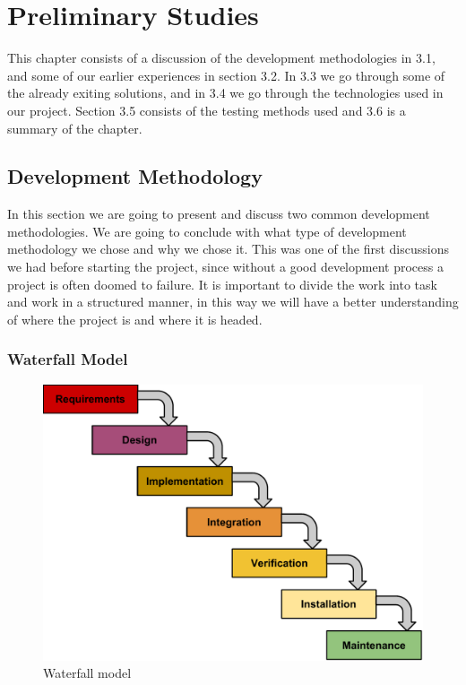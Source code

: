 \chapter{Preliminary Studies}
\label{Preliminary Studies}

This chapter consists of a discussion of the development methodologies in 3.1, and some of our earlier experiences in section 3.2.
In 3.3 we go through some of the already exiting solutions, and in 3.4 we go through the technologies used in our project.
Section 3.5 consists of the testing methods used and 3.6 is a summary of the chapter.



\section{Development Methodology}

In this section we are going to present and discuss two common development methodologies.
We are going to conclude with what type of development methodology we chose and why we chose it.
This was one of the first discussions we had before starting the project, since without a good development process a project is often doomed to failure.
It is important to divide the work into task and work in a structured manner, in this way we will have a better understanding of where the project is and where it is headed.

\subsection{Waterfall Model \cite{WaterfallModel}}

\begin{figure}
\begin{center}
\includegraphics[scale=0.6]{../Figures/Waterfall-model.pdf}
\end{center}
\caption{Waterfall model}
\label{figure:waterfall-model}
\end{figure}

